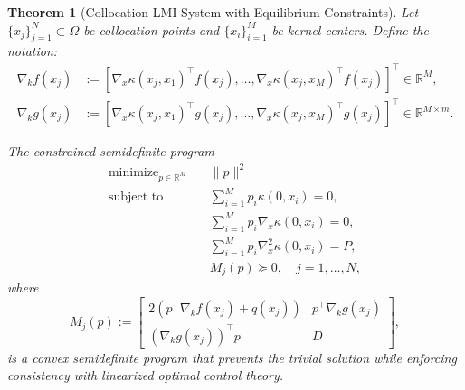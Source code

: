 \documentclass[11pt]{article}
\newtheorem{theorem}{Theorem}[section]
\newcommand{\minimize}{\text{minimize}}
\newcommand{\real}{\mathbb{R}}
\begin{document}
\begin{theorem}[Collocation LMI System with Equilibrium Constraints]
\label{thm:collocation}
Let $\{x_j\}_{j=1}^N \subset \Omega$ be collocation points and $\{x_i\}_{i=1}^M$ be kernel centers. Define the notation:
\begin{align*}
\nabla_k f(x_j) &:= [\nabla_x \kappa(x_j, x_1)^\top f(x_j), \ldots, \nabla_x \kappa(x_j, x_M)^\top f(x_j)]^\top \in \real^M, \\
\nabla_k g(x_j) &:= [\nabla_x \kappa(x_j, x_1)^\top g(x_j), \ldots, \nabla_x \kappa(x_j, x_M)^\top g(x_j)]^\top \in \real^{M \times m}.
\end{align*}

The constrained semidefinite program
\begin{subequations}
\begin{align}
\minimize_{p \in \real^M} \quad & \|p\|^2 \label{eq:sdp_obj} \\
\text{subject to} \quad & \sum_{i=1}^M p_i \kappa(0, x_i) = 0, \label{eq:sdp_boundary} \\
& \sum_{i=1}^M p_i \nabla_x \kappa(0, x_i) = 0, \label{eq:sdp_gradient} \\
& \sum_{i=1}^M p_i \nabla_x^2 \kappa(0, x_i) = P, \label{eq:sdp_hessian} \\
& M_j(p) \succeq 0, \quad j = 1, \ldots, N, \label{eq:sdp_lmi}
\end{align}
\label{eq:sdp}
\end{subequations}
where
\begin{equation}
M_j(p) := \begin{bmatrix}
2(p^\top \nabla_k f(x_j) + q(x_j)) & p^\top \nabla_k g(x_j) \\
(\nabla_k g(x_j))^\top p & D
\end{bmatrix},
\label{eq:Mj_matrix}
\end{equation}
is a convex semidefinite program that prevents the trivial solution while enforcing consistency with linearized optimal control theory.
\end{theorem}
\end{document}
